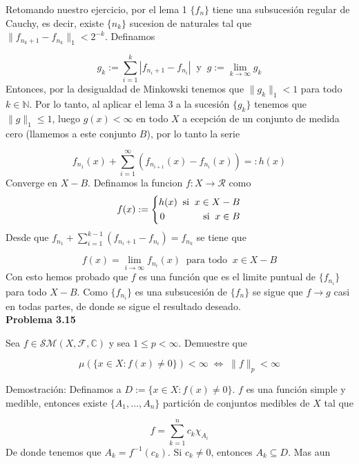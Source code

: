 \documentclass[12pt]{article}
\begin{document}
    Retomando nuestro ejercicio, por el lema 1 $\{f_n\}$ tiene una subsucesi\'on regular
    de Cauchy, es decir, existe $\{n_k\}$ sucesion de naturales tal que 
    $\|f_{n_k+1}-f_{n_k}\|_1 < 2^{-k}$. Definamos

    \[g_k := \sum_{i=1}^k|f_{n_i+1}-f_{n_i}|\;\; \text{y}\;\; g:= \lim_{k\rightarrow \infty}g_k\]
    Entonces, por la desigualdad de Minkowski tenemos que $\|g_k\|_1 < 1$ para todo 
    $k\in \mathbb{N}$. Por lo tanto, al aplicar el lema 3 a la sucesi\'on $\{g_k\}$
    tenemos que $\|g\|_1 \leq 1$, luego $g(x) < \infty$ en todo $X$ a ecepci\'on de un 
    conjunto de medida cero (llamemos a este conjunto $B$), por lo tanto la serie

    \[f_{n_1}(x)+\sum_{i=1}^{\infty} (f_{n_{i+1}}(x)-f_{n_i}(x)) =: h(x)\]
    Converge en $X-B$. Definamos la funcion $f:X\rightarrow \mathcal{R}$ como 
    \begin{equation*}
        f(x) := \left\{
            \begin{aligned}
                h(x)\;\;\text{si}\;\; x\in X-B \\
                0 \hspace*{40pt} \text{si}\;\; x\in B
            \end{aligned}
            \right.
    \end{equation*}
    Desde que $f_{n_1}+\sum_{i=1}^{k-1}(f_{n_i+1}-f_{n_i}) = f_{n_k}$ se tiene que 

    \[f(x) = \lim_{i\rightarrow \infty}f_{n_i}(x)\;\; \text{para todo}\;\; x\in X-B\]
    Con esto hemos probado que $f$ es una funci\'on que es el limite puntual de 
    $\{f_{n_i}\}$ para todo $X-B$. Como $\{f_{n_i}\}$ es una subsucesi\'on de 
    $\{f_{n}\}$ se sigue que $f\rightarrow g$ casi en todas partes, de donde se sigue 
    el resultado deseado.
    \\

    \textbf{Problema 3.15}

    Sea $f\in \mathcal{SM}(X,\mathcal{F},\mathbb{C})$ y sea $1 \leq p < \infty$. Demuestre 
    que 

    \[\mu(\{x\in X : f(x) \neq 0\}) < \infty \; \Leftrightarrow\; \|f\|_p < \infty\]

    Demostraci\'on: Definamos a $D :=\{x\in X : f(x) \neq 0\}$. $f$ es una funci\'on simple 
    y medible, entonces existe 
    $\{A_1,\ldots,A_n\}$ partici\'on de conjuntos medibles de $X$ tal que 

    \[f = \sum_{k=1}^n c_k\chi_{A_i}\]
    De donde tenemos que $A_k = f^{-1}(c_k)$. Si $c_k \neq 0$, entonces $A_k \subseteq D$.
    Mas aun
\end{document}
